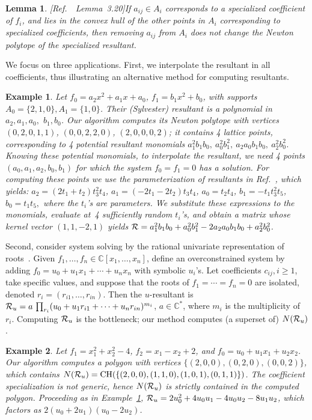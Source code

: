\documentclass{article}
\newtheorem{example}{Example}
\newtheorem{lemma}{Lemma}
\newcommand\refcite[1]{\citealp{#1}} \newcommand\citess[1]{\textsuperscript{\textup{\citealp{#1}}}}
\def\CC{{\mathbb C}} \def\PP{{\mathbb P}}
\newcommand{\CH}{\mbox{CH}}
\begin{document}
\begin{lemma}{\rm [Ref.~\refcite{JensenYu11}~Lemma~3.20]}\label{Linsidepoints}
If $a_{ij} \in A_i$ corresponds to a specialized coefficient of $f_i$,
and lies in the convex hull of the other points in $A_i$ corresponding
to specialized coefficients, then removing $a_{ij}$ from $A_i$ does not
change the Newton polytope of the specialized resultant.
\end{lemma} 

We focus on three applications. First,
we interpolate the resultant in all coefficients, thus illustrating
an alternative method for computing resultants.
\begin{example}\label{ExamGenRes}
Let $f_0=a_2x^2+a_1x+a_0$, $f_1=b_1x^2+b_0$, with supports
$A_0=\{2,1,0\}, A_1=\{1,0\}$.
Their (Sylvester) resultant is a polynomial in $a_2, a_1, a_0,$ $b_1, b_0$.
Our algorithm computes its Newton polytope with vertices
$(0, 2, 0, 1, 1)$,  $(0, 0, 2, 2, 0)$, $(2, 0, 0, 0, 2)$;
it contains 4 lattice points, corresponding to 4 potential resultant monomials
$a_1^2 b_1  b_0,~ a_0^2 b_1^2,~  a_2 a_0 b_1 b_0,~ a_2^2 b_0^2$.
Knowing these potential monomials, to interpolate the resultant, we need 4 
points $(a_0, a_1, a_2, b_0, b_1)$
for which the system $f_0= f_1=0$ has a solution.
For computing these points we use the
parameterization 
of resultants in Ref.~\refcite{Kap91}, which yields:
$a_2=(2t_1+t_2)t_3^2t_4$,  $a_1=(-2t_1-2t_2)t_3 t_4$,
$a_0=t_2t_4$, $b_1=-t_1t_3^2t_5$, $b_0=t_1t_5,$
where the $t_i$'s are parameters.
We substitute these expressions to the monomials,
evaluate at~4 sufficiently random $t_i$'s, and obtain a matrix
whose kernel vector $(1, 1, -2, 1)$ yields
${\mathcal R}= a_1^2 b_1 b_0 + a_0^2 b_1^2 -2a_2 a_0 b_1 b_0+a_2^2b_0^2$.
\end{example}

Second, consider system solving by the
rational univariate representation of roots~\citess{BaPoRo}. 
Given $f_1,\dots,f_n\in \CC[x_1,\dots,x_n]$,
define an overconstrained system by adding
$f_0=u_0 + u_1x_1+\cdots + u_nx_n$ with symbolic $u_i$'s.
Let coefficients $c_{ij}, i\ge 1$, take specific values,
and suppose that the roots of $f_1 = \cdots =f_n=0$ are isolated, denoted
$r_i=(r_{i1},\dots,r_{in})$.
Then the $u$-resultant is
${\mathcal R}_u= a\, \prod_{r_i} (u_0+u_1r_{i1}+\cdots + u_nr_{in})^{m_i}$, 
$a\in\CC^*$, where $m_i$ is the multiplicity of $r_i$.
Computing ${\mathcal R}_u$ is the bottleneck; our method computes 
(a superset of) $N({\mathcal R}_u)$.

\begin{example}\label{ExamUres}
Let $f_1=x_1^2+x_2^2-4$, $f_2=x_1-x_2+2$, and $f_0=u_0+u_1x_1+u_2x_2$.
Our algorithm computes a polygon with vertices 
$\{(2,0,0),(0,2,0),(0,0,2)\}$, which contains $N(\R_u)=
\CH(\{(2, 0, 0), (1, 1, 0), (1, 0, 1), (0,1,1)\})$. 
The coefficient specialization is not generic, hence $N({\mathcal R}_u)$ is
strictly contained in the computed polygon.
Proceeding as in Example~\ref{ExamGenRes},
${\mathcal R}_u= 2u_0^2+4u_0u_1-4u_0u_2-8u_1u_2$, which factors as
$2 (u_0 + 2u_1) (u_0-2u_2) $.
\end{example} 
\end{document}
